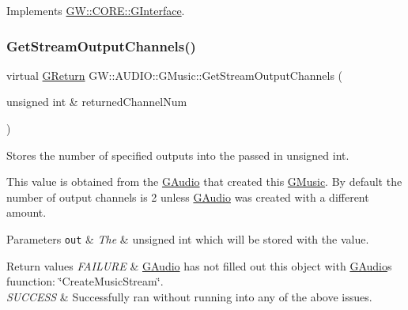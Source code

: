 Implements \mbox{\hyperlink{class_g_w_1_1_c_o_r_e_1_1_g_interface_aacf5834174a7024f8a3c361122ee9e76}{G\+W\+::\+C\+O\+R\+E\+::\+G\+Interface}}.

\mbox{\label{class_g_w_1_1_a_u_d_i_o_1_1_g_music_a750dcb654e813c322d7617e1a5ebdf93}} 
\subsubsection{\texorpdfstring{Get\+Stream\+Output\+Channels()}{GetStreamOutputChannels()}}
{\footnotesize\ttfamily virtual \mbox{\hyperlink{namespace_g_w_a67a839e3df7ea8a5c5686613a7a3de21}{G\+Return}} G\+W\+::\+A\+U\+D\+I\+O\+::\+G\+Music\+::\+Get\+Stream\+Output\+Channels (\begin{DoxyParamCaption}\item[{unsigned int \&}]{returned\+Channel\+Num }\end{DoxyParamCaption})\hspace{0.3cm}{\ttfamily [pure virtual]}}



Stores the number of specified outputs into the passed in unsigned int. 

This value is obtained from the \mbox{\hyperlink{class_g_w_1_1_a_u_d_i_o_1_1_g_audio}{G\+Audio}} that created this \mbox{\hyperlink{class_g_w_1_1_a_u_d_i_o_1_1_g_music}{G\+Music}}. By default the number of output channels is 2 unless \mbox{\hyperlink{class_g_w_1_1_a_u_d_i_o_1_1_g_audio}{G\+Audio}} was created with a different amount.


\begin{DoxyParams}[1]{Parameters}
\mbox{\tt out}  & {\em The} & unsigned int which will be stored with the value.\\
\hline
\end{DoxyParams}

\begin{DoxyRetVals}{Return values}
{\em F\+A\+I\+L\+U\+RE} & \mbox{\hyperlink{class_g_w_1_1_a_u_d_i_o_1_1_g_audio}{G\+Audio}} has not filled out this object with \mbox{\hyperlink{class_g_w_1_1_a_u_d_i_o_1_1_g_audio}{G\+Audio}}\textquotesingle{}s fuunction\+: \char`\"{}\+Create\+Music\+Stream\char`\"{}. \\
\hline
{\em S\+U\+C\+C\+E\+SS} & Successfully ran without running into any of the above issues. \\
\hline
\end{DoxyRetVals}
\mbox{\label{class_g_w_1_1_a_u_d_i_o_1_1_g_music_aef10f15b8487e18c2d65d1666ba64662}} 
